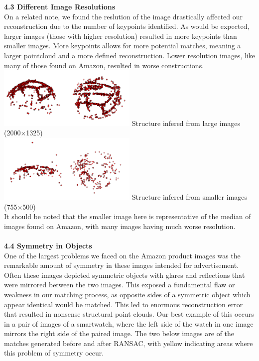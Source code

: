 \documentclass[12pt]{article}
\begin{document}
\begin{multicols}{2}
{\large \textbf{4.3 Different Image Resolutions}}\\
On a related note, we found the reslution of the image drastically affected our reconstruction due to the number of keypoints identified. As would be expected, larger images (those with higher resolution) resulted in more keypoints than smaller images. More keypoints allows for more potential matches, meaning a larger pointcloud and a more defined reconstruction. Lower resolution images, like many of those found on Amazon,  resulted in worse constructions. 
\includegraphics[width=0.5\textwidth]{images/VBallMediumSurf_SideBySide.png}
Structure infered from large images (2000$\times$1325) \\
\includegraphics[width=0.5\textwidth]{images/VBallSmallSurf_SideBySide.png}
Structure infered from smaller images (755$\times$500) \\
It should be noted that the smaller image here is representative of the median of images found on Amazon, with many images having much worse resolution. \\\\
{\large \textbf{4.4 Symmetry in Objects}}\\
One of the largest problems we faced on the Amazon product images was the remarkable amount of symmetry in these images intended for advertisement. Often these images depicted symmetric objects with glares and reflections that were mirrored between the two images. This exposed a fundamental flaw or weakness in our matching process, as opposite sides of a symmetric object which appear identical would be matched. This led to enormous reconstruction error that resulted in nonsense structural point clouds. Our best example of this occurs in a pair of images of a smartwatch, where the left side of the watch in one image mirrors the right side of the paired image. The two below images are of the matches generated before and after RANSAC, with yellow indicating areas where this problem of symmetry occur.\\

\end{multicols}
\end{document}
